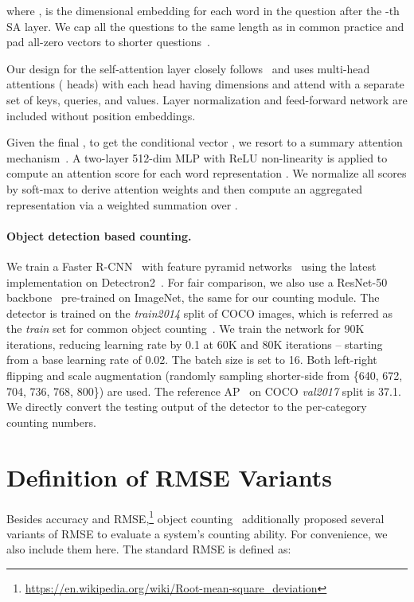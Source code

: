 \documentclass{article} \usepackage[dvipsnames,table]{xcolor}
\def\x{\xspace}
\begin{document}
where ,  is the  dimensional embedding for each word in the question after the -th SA layer. We cap all the questions to the same length  as in common practice and pad all-zero vectors to shorter questions~\cite{nguyen2018improved}.

Our design for the self-attention layer closely follows~\cite{vaswani2017attention} and uses multi-head attentions ( heads) with each head having  dimensions and attend with a separate set of keys, queries, and values. Layer normalization and feed-forward network are included without position embeddings.

Given the final , to get the conditional vector , we resort to a summary attention mechanism~\cite{nguyen2018improved}. A two-layer 512-dim MLP with ReLU non-linearity is applied to compute an attention score  for each word representation . We normalize all scores by soft-max to derive attention weights  and then compute an aggregated representation  via a weighted summation over .

\paragraph{Object detection based counting.} We train a Faster R-CNN~\cite{ren2015faster} with feature pyramid networks~\cite{lin2017feature} using the latest implementation on Detectron2~\cite{wu2019detectron2}. For fair comparison, we also use a ResNet-50 backbone~\cite{he2016deep} pre-trained on ImageNet, the same for our counting module. The detector is trained on the \emph{train2014} split of COCO images, which is referred as the \emph{train} set for common object counting~\cite{chattopadhyay2017counting}. We train the network for 90K iterations, reducing learning rate by 0.1\x at 60K and 80K iterations -- starting from a base learning rate of 0.02. The batch size is set to 16. Both left-right flipping and scale augmentation (randomly sampling shorter-side from \{640, 672, 704, 736, 768, 800\}) are used. The reference AP~\cite{ren2015faster} on COCO \emph{val2017} split is 37.1. We directly convert the testing output of the detector to the per-category counting numbers.

\section{Definition of RMSE Variants\label{sec:metrics}}

Besides accuracy and RMSE,\footnote{\url{https://en.wikipedia.org/wiki/Root-mean-square_deviation}} object counting~\cite{chattopadhyay2017counting} additionally proposed several variants of RMSE to evaluate a system's counting ability. For convenience, we also include them here. The standard RMSE is defined as:
\end{document}
